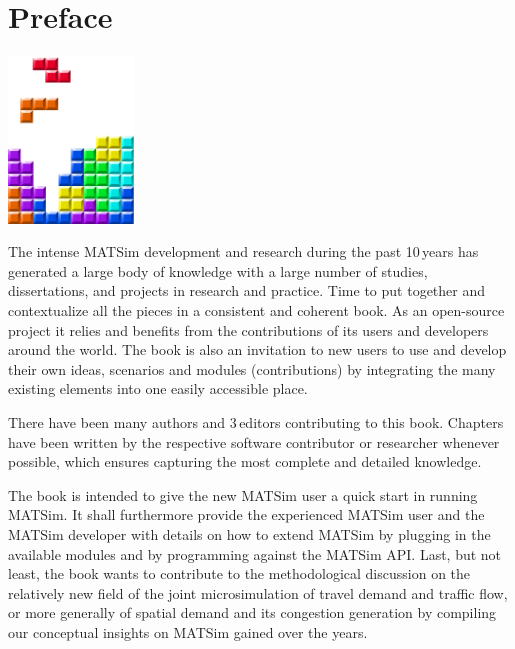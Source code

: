 \chapter*{Preface}

\begin{center} \includegraphics[width=0.25\textwidth, angle=0]{figures/MATSimBook.png} \end{center}


The intense MATSim development and research during the past 10\,years has generated a large body of knowledge with a large number of studies, dissertations, and projects in research and practice. Time to put together and contextualize all the pieces in a consistent and coherent book. As an open-source project it relies and benefits from the contributions of its users and developers around the world. The book is also an invitation to new users to use and develop their own ideas, scenarios and modules (contributions) by integrating the many existing elements into one easily accessible place.

There have been many authors and 3\,editors contributing to this book. Chapters have been written by the respective software contributor or researcher whenever possible, which ensures capturing the most complete and detailed knowledge. 

The book is intended to give the new MATSim user a quick start in running MATSim. It shall furthermore provide the experienced MATSim user and the MATSim developer with details on how to extend MATSim by plugging in the available modules and by programming against the MATSim API. Last, but not least, the book wants to contribute to the methodological discussion on the relatively new field of the joint microsimulation of travel demand and traffic flow, or more generally of spatial demand and its congestion generation by compiling our conceptual insights on MATSim gained over the years.

